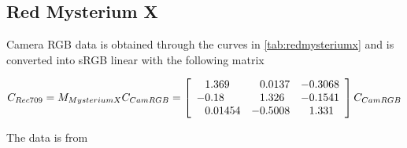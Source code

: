 \subsection{Red Mysterium X}

Camera \gls{RGB} data is obtained through the curves in
\cref{tab:redmysteriumx} and is converted into
\gls{sRGB} linear with the following matrix

\begin{displaymath}
C_{Rec709} = M_{MysteriumX} C_{CamRGB} = \left[\begin{array}{r@{.}lr@{.}lr@{.}l}
 1&369   &  0&0137 & -0&3068 \\
-0&18    &  1&326  & -0&1541 \\
 0&01454 & -0&5008 &  1&331  \\
\end{array}\right] C_{CamRGB}
\end{displaymath}

The data is from~\cite{sarlat2012}

